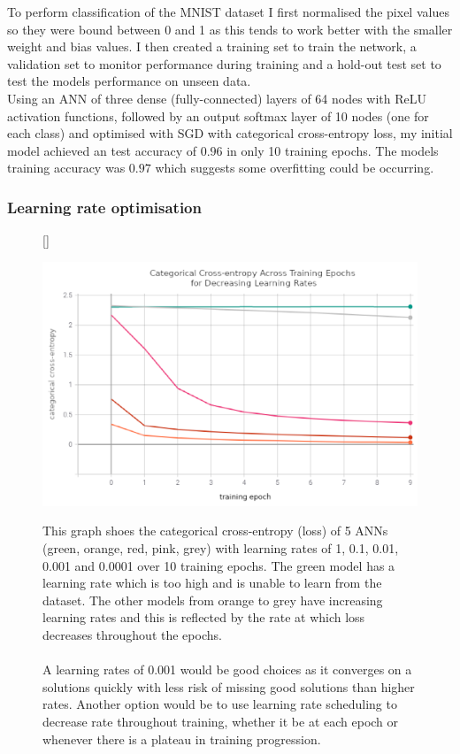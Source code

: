 \documentclass[11pt]{article}
\begin{document}
To perform classification of the MNIST dataset I first normalised the pixel values so they were bound between 0 and 1 as this tends to work better with the smaller weight and bias values. I then created a training set to train the network, a validation set to monitor performance during training and a hold-out test set to test the models performance on unseen data. \\

Using an ANN of three dense (fully-connected) layers of 64 nodes with ReLU activation functions, followed by an output softmax layer of 10 nodes (one for each class) and optimised with SGD with categorical cross-entropy loss, my initial model achieved an test accuracy of $0.96$ in only 10 training epochs. The models training accuracy was $0.97$ which suggests some overfitting could be occurring.

\subsubsection{Learning rate optimisation}

\begin{figure}[h]
[\FBwidth]
{\caption{This graph shoes the categorical cross-entropy (loss) of 5 ANNs (green, orange, red, pink, grey) with learning rates of 1, 0.1, 0.01, 0.001 and 0.0001 over 10 training epochs. The green model has a learning rate which is too high and is unable to learn from the dataset. The other models from orange to grey have increasing learning rates and this is reflected by the rate at which loss decreases throughout the epochs. \\ \\ A learning rates of 0.001 would be good choices as it converges on a solutions quickly with less risk of missing good solutions than higher rates. Another option would be to use learning rate scheduling to decrease rate throughout training, whether it be at each epoch or whenever there is a plateau in training progression.}}
{\includegraphics[height=0.65\linewidth]{figures/02_classification/learning_rates.png}}
\label{learning_rates}
\end{figure}
\end{document}
